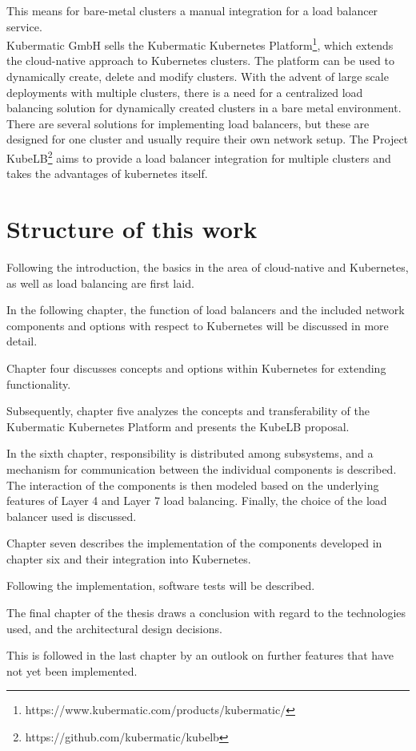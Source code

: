This means for bare-metal clusters a manual integration for a load balancer service.
\\
Kubermatic GmbH sells the Kubermatic Kubernetes Platform\footnote{https://www.kubermatic.com/products/kubermatic/}, which extends the cloud-native approach to Kubernetes clusters.
The platform can be used to dynamically create, delete and modify clusters.
With the advent of large scale deployments with multiple clusters, there is a need for a centralized load balancing solution for dynamically created clusters in a bare metal environment.
There are several solutions for implementing load balancers, but these are designed for one cluster and usually require their own network setup.
The Project KubeLB\footnote{https://github.com/kubermatic/kubelb} aims to provide a load balancer integration for multiple clusters and takes the advantages of kubernetes itself.

\newpage

\section{Structure of this work}
Following the introduction, the basics in the area of cloud-native and Kubernetes, as well as load balancing are first laid.

In the following chapter, the function of load balancers and the included network components and options with respect to Kubernetes will be discussed in more detail.

Chapter four discusses concepts and options within Kubernetes for extending functionality.

Subsequently, chapter five analyzes the concepts and transferability of the Kubermatic Kubernetes Platform and presents the KubeLB proposal.

In the sixth chapter, responsibility is distributed among subsystems, and a mechanism for communication between the individual components is described.
The interaction of the components is then modeled based on the underlying features of Layer 4 and Layer 7 load balancing.
Finally, the choice of the load balancer used is discussed.

Chapter seven describes the implementation of the components developed in chapter six and their integration into Kubernetes.

Following the implementation, software tests will be described.

The final chapter of the thesis draws a conclusion with regard to the technologies used, and the architectural design decisions.

This is followed in the last chapter by an outlook on further features that have not yet been implemented.


